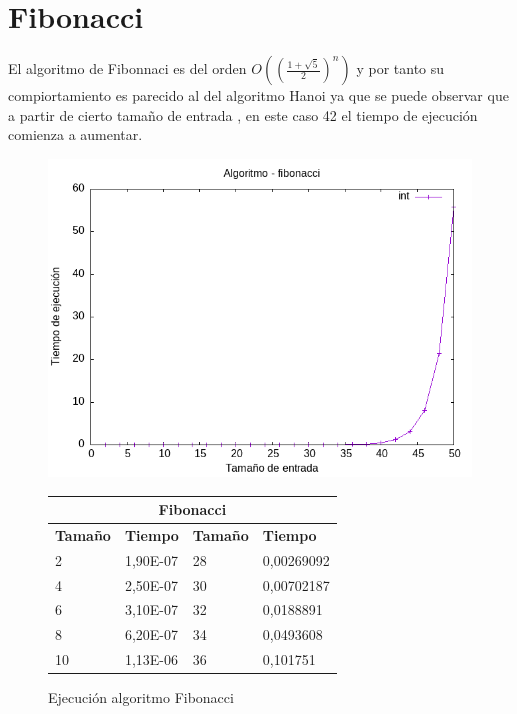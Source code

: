 \documentclass[11pt,openany]{book}
\begin{document}
\section*{Fibonacci}
El algoritmo de Fibonnaci es del orden $O((\frac{1+\sqrt{5}}{2})^n)$ y por tanto su compiortamiento es parecido al del algoritmo Hanoi ya que se puede
observar que a partir de cierto tamaño de entrada , en este caso 42 el tiempo de ejecución comienza a aumentar.
\begin{figure}[H]
    \begin{minipage}{0.5\textwidth}
        \centering
        \includegraphics[width=\linewidth]{assets/Img/fibonacciint.png}
        \caption{Ejecución algoritmo Fibonacci}
        \label{fig:fibonacci}
    \end{minipage}%
    \begin{minipage}{0.5\textwidth}
        \centering
        \small
        \begin{tabular}{|l|l|l|l|}
        \hline
        \multicolumn{4}{|c|}{\cellcolor{blue!20}\textbf{Fibonacci}} \\ \hline 
        \textbf{Tamaño} & \textbf{Tiempo} & \textbf{Tamaño} & \textbf{Tiempo} \\ \hline
        2 & 1,90E-07 & 28 & 0,00269092 \\ \hline
        4 & 2,50E-07 & 30 & 0,00702187 \\ \hline
        6 & 3,10E-07 & 32 & 0,0188891 \\ \hline
        8 & 6,20E-07 & 34 & 0,0493608 \\ \hline
        10 & 1,13E-06 & 36 & 0,101751 \\ \hline

\end{tabular}
\end{minipage}
\end{figure}
\end{document}
